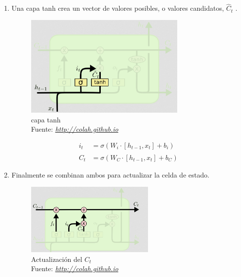 \begin{enumerate}
\begin{enumerate}
		\item Una capa tanh crea un vector de valores posibles, o valores candidatos, $\hat{C}_{t}$ .
		\begin{figure}[H]
			\centering
			\includegraphics[width=0.75\textwidth]{Figures/forgetay2.png}
			\caption{capa tanh \\ Fuente:  \href{http://colah.github.io/posts/2015-08-Understanding-LSTMs/}{\textit{http://colah.github.io}}}
			\label{}
		\end{figure}
		\begin{equation}
			\label{forget layer}
			\begin{aligned}
			i_{t}&=\sigma(W_{i}\cdot[h_{t-1},x_{t}]+b_{i})\\
			\hat{C}_{t}&=\sigma(W_{C}\cdot[h_{t-1},x_{t}]+b_{C})
			\end{aligned}
			\end{equation}
		\item Finalmente se combinan ambos para actualizar la celda de estado.
		\begin{figure}[H]
			\centering
			\includegraphics[width=0.6\textwidth]{Figures/LSTM8.png}
			\caption{Actualización del $C_{t}$ \\ Fuente:  \href{http://colah.github.io/posts/2015-08-Understanding-LSTMs/}{\textit{http://colah.github.io}}}
			\label{}
		\end{figure}
		\begin{equation}
			\label{ctlayer}
			\begin{aligned}

\end{aligned}
\end{equation}
\end{enumerate}
\end{enumerate}
